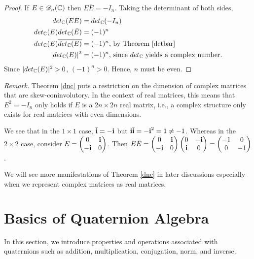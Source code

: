 \begin{proof}
	If $E \in \mathscr{D}_{n}(\operatorname{\mathbb{C}})$ then $E\bar{E} = -I_n$. \newline Taking the determinant of both sides, 
	\begin{align*}
		det_{\operatorname{\mathbb{C}}}(E\bar{E}) &= det_{\operatorname{\mathbb{C}}}(-I_n) \\
		det_{\operatorname{\mathbb{C}}}(E)det_{\operatorname{\mathbb{C}}}(\bar{E}) &= (-1)^n \\
		det_{\operatorname{\mathbb{C}}}(E)\overline{det_{\operatorname{\mathbb{C}}}(E)} &= (-1)^n \text{, by Theorem \ref{detbar}} \\
		|det_{\operatorname{\mathbb{C}}}(E)|^2 &= (-1)^n \text{, since $det_{\operatorname{\mathbb{C}}}$ yields a complex number.}
	\end{align*}
	Since $|det_{\operatorname{\mathbb{C}}}(E)|^2 > 0$, $(-1)^n > 0$. Hence, $n$ must be even.
\end{proof}
\newline
\newline
\textit{Remark.} Theorem \ref{dnc} puts a restriction on the dimension of complex matrices that are skew-coninvolutory. In the context of real matrices, this means that $E^2 = -I_n$ only holds if $E$ is a $2n\times 2n$ real matrix, i.e., a complex structure only exists for real matrices with even dimensions. 
\begin{ex} 
We see that in the $1\times 1$ case, $\bar{\textbf{i}} = -\textbf{i}$ but $\textbf{i}\bar{\textbf{i}} = -\textbf{i}^2 = 1 \neq -1$. Whereas in the $2\times 2$ case, consider $E = 
\begin{pmatrix}
	0 & \textbf{i} \\
	-\textbf{i} & 0
\end{pmatrix}$.
Then $E\bar{E} = 
\begin{pmatrix}
	0 & \textbf{i} \\
	-\textbf{i} & 0
\end{pmatrix}
\begin{pmatrix}
	0 & -\textbf{i} \\
	\textbf{i} & 0
\end{pmatrix}  = 
\begin{pmatrix}
	-1 & 0 \\
	0 & -1
\end{pmatrix}$.
\end{ex} 
We will see more manifestations of Theorem \ref{dnc} in later discussions especially when we represent complex matrices as real matrices.

\section{Basics of Quaternion Algebra}

In this section, we introduce properties and operations associated with quaternions such as addition, multiplication, conjugation, norm, and inverse.

